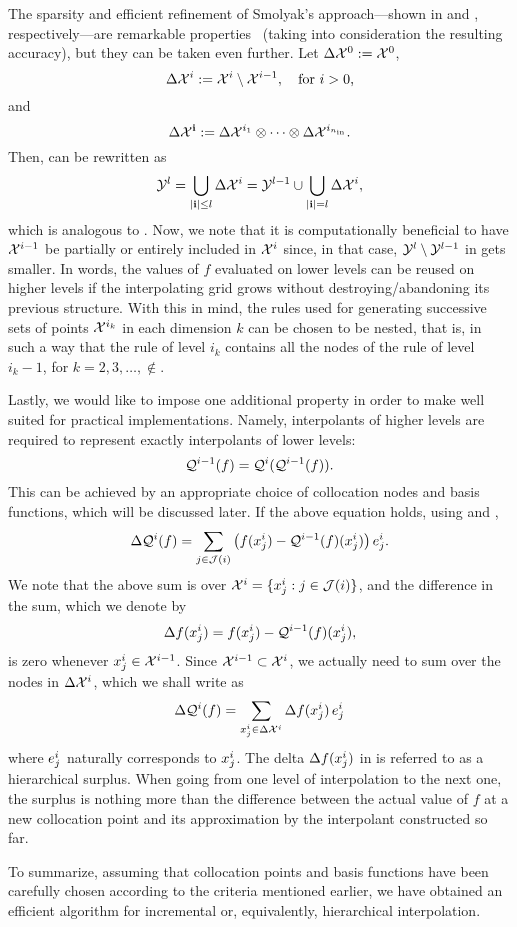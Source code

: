 The sparsity and efficient refinement of Smolyak's approach---shown in
 and , respectively---are
remarkable properties \perse\ (taking into consideration the resulting
accuracy), but they can be taken even further. Let $\Delta\mathcal{X}^0 := \mathcal{X}^0$,
\[
  \Delta\mathcal{X}^i := \mathcal{X}^i \setminus \mathcal{X}^{i - 1}, \quad \text{for $i > 0$,}
\]
and
\[
  \Delta\mathcal{X}^{\mathbf{i}} := \Delta\mathcal{X}^{i_1} \otimes \cdots \otimes \Delta\mathcal{X}^{i_{n_\text{in}}}.
\]
Then,  can be rewritten as
\begin{equation} \elab{smolyak-grid-incremental}
  \Y^l = \bigcup_{|\vi| \leq l} \Delta\X^i = \Y^{l - 1} \cup \bigcup_{|\vi| = l} \Delta\X^i,
\end{equation}
which is analogous to . Now, we note that it is
computationally beneficial to have $\mathcal{X}^{i - 1}$ be partially or entirely
included in $\mathcal{X}^i$ since, in that case, $\mathcal{Y}^l \setminus \mathcal{Y}^{l - 1}$ in
 gets smaller. In words, the values of $f$
evaluated on lower levels can be reused on higher levels if the interpolating
grid grows without destroying/abandoning its previous structure. With this in
mind, the rules used for generating successive sets of points $\mathcal{X}^{i_k}$ in each
dimension $k$ can be chosen to be nested, that is, in such a way that the rule
of level $i_k$ contains all the nodes of the rule of level $i_k - 1$, for $k =
2, 3, \dots, \nin$.

Lastly, we would like to impose one additional property in order to make
 well suited for practical implementations. Namely,
interpolants of higher levels are required to represent exactly interpolants
of lower levels:
\[
  \mathcal{Q}^{i - 1}(f) = \mathcal{Q}^{i}(\mathcal{Q}^{i - 1}(f)).
\]
This can be achieved by an appropriate choice of collocation nodes and basis
functions, which will be discussed later. If the above equation holds, using
 and ,
\[
  \Delta\mathcal{Q}^{i}(f) = \sum_{j \in \mathcal{J}(i)} \left(f(x^i_j) - \mathcal{Q}^{i - 1}(f)(x^i_j)\right) e^i_j.
\]
We note that the above sum is over $\mathcal{X}^i = \{ x^i_j: j \in \mathcal{J}(i) \}$, and
the difference in the sum, which we denote by
\begin{equation} \elab{surplus}
  \surplus(\x^i_j) = f(\x^i_j) - \tensor{i - 1}(f)(\x^i_j),
\end{equation}
is zero whenever $x^i_j \in \mathcal{X}^{i - 1}$. Since $\mathcal{X}^{i - 1} \subset \mathcal{X}^i$, we
actually need to sum over the nodes in $\Delta\mathcal{X}^i$, which we shall write as
\[
  \Delta\mathcal{Q}^{i}(f) = \sum_{x^i_j \in \Delta\mathcal{X}^i} \Delta f(x^i_j) \, e^i_j
\]
where $e^i_j$ naturally corresponds to $x^i_j$. The delta $\Delta f(x^i_j)$
in  is referred to as a hierarchical surplus. When going from one
level of interpolation to the next one, the surplus is nothing more than the
difference between the actual value of $f$ at a new collocation point and its
approximation by the interpolant constructed so far.

To summarize, assuming that collocation points and basis functions have been
carefully chosen according to the criteria mentioned earlier, we have obtained
an efficient algorithm for incremental or, equivalently, hierarchical
interpolation.  
